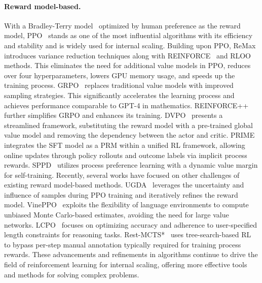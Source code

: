 \paragraph{Reward model-based.}
With a Bradley-Terry model~\citep{zheng2023secrets} optimized by human preference as the reward model, PPO~\citep{schulman2017proximalpolicyoptimizationalgorithms} stands as one of the most influential algorithms with its efficiency and stability and is widely used for internal scaling. 
Building upon PPO, ReMax~\citep{li2023remax} introduces variance reduction techniques along with REINFORCE~\citep{sutton1999policy} and RLOO~\citep{ahmadian2024back} methods. This eliminates the need for additional value models in PPO, reduces over four hyperparameters, lowers GPU memory usage, and speeds up the training process.
GRPO~\citep{shao2024deepseekmath} replaces traditional value models with improved sampling strategies. This significantly accelerates the learning process and achieves performance comparable to GPT-4 in mathematics.  REINFORCE++~\citep{hu2025reinforce++} further simplifies GRPO and enhances its training.
DVPO~\citep{huang2025lean} presents a streamlined framework, substituting the reward model with a pre-trained global value model and removing the dependency between the actor and critic. PRIME~\citep{cui2025process} integrates the SFT model as a PRM within a unified RL framework, allowing online updates through policy rollouts and outcome labels via implicit process rewards. SPPD~\citep{yi2025sppd} utilizes process preference learning with a dynamic value margin for self-training.
Recently, several works have focused on other challenges of existing reward model-based methods. UGDA~\citep{sun2025uncertain} leverages the uncertainty and influence of samples during PPO training and iteratively refines the reward model. VinePPO~\citep{kazemnejad2024vineppo} exploits the flexibility of language environments to compute unbiased Monte Carlo-based estimates, avoiding the need for large value networks. LCPO~\citep{aggarwal2025l1} focuses on optimizing accuracy and adherence to user-specified length constraints for reasoning tasks. Rest-MCTS*~\citep{zhang2024rest} uses tree-search-based RL to bypass per-step manual annotation typically required for training process rewards.
These advancements and refinements in algorithms continue to drive the field of reinforcement learning for internal scaling, offering more effective tools and methods for solving complex problems.



